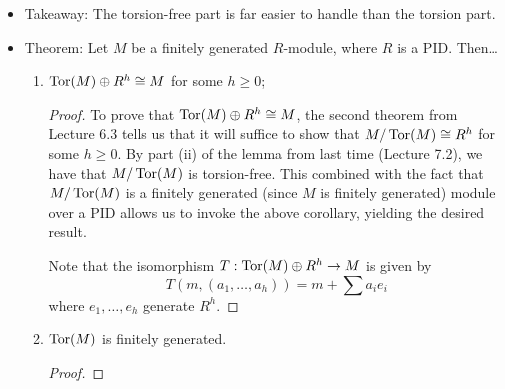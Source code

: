 \documentclass[../notes.tex]{subfiles}
\begin{document}
\begin{itemize}
\begin{proof}
        Apply the lemma to obtain a submodule $M'$ of $M$ such that $M'\cong R^h$ and a nonzero $a\in R$ such that $aM\subset M'$. Consider $H:M\to M'$ defined by $H(m)=am$. Since $H$ is just left-multiplication, $H$ is an $R$-module homomorphism. Additionally, since $M$ is torsion free, $am=0$ iff $m=0$ so we have $\ker H=0$. Thus, since $H$ is injective, $M\cong H(M)\subset M'\cong R^h$. Furthermore, since $R$ is a PID, the submodule $H(M)$ of $R^h$ must be isomorphic to $R^n$ for some $0\leq n\leq h$ by the Theorem from Week 6. It follows by transitivity that $M\cong H(M)\cong R^n$, as desired.
    \end{proof}
    \item Takeaway: The torsion-free part is far easier to handle than the torsion part.
    \item Theorem: Let $M$ be a finitely generated $R$-module, where $R$ is a PID. Then\dots
    \begin{enumerate}[label={(\roman*)}]
        \item $\operatorname{Tor}(M)\oplus R^h\cong M$ for some $h\geq 0$;
        \begin{proof}

            To prove that $\operatorname{Tor}(M)\oplus R^h\cong M$, the second theorem from Lecture 6.3 tells us that it will suffice to show that $M/\operatorname{Tor}(M)\cong R^h$ for some $h\geq 0$. By part (ii) of the lemma from last time (Lecture 7.2), we have that $M/\operatorname{Tor}(M)$ is torsion-free. This combined with the fact that $M/\operatorname{Tor}(M)$ is a finitely generated (since $M$ is finitely generated) module over a PID allows us to invoke the above corollary, yielding the desired result.\par
            Note that the isomorphism $T:\operatorname{Tor}(M)\oplus R^h\to M$ is given by
            \begin{equation*}
                T(m,(a_1,\dots,a_h)) = m+\sum a_ie_i
            \end{equation*}
            where $e_1,\dots,e_h$ generate $R^h$.
        \end{proof}
        \item $\operatorname{Tor}(M)$ is finitely generated.
        \begin{proof}


\end{proof}
\end{enumerate}
\end{itemize}
\end{document}
